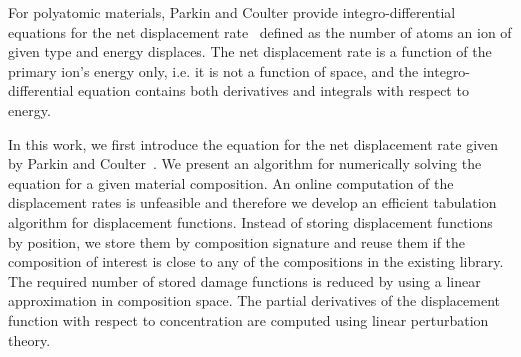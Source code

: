 \documentclass[letterpaper]{mandc2019}
\begin{document}
For polyatomic materials, Parkin and Coulter provide integro-differential equations for the net displacement rate~\cite{PC1981} defined as the number of atoms an ion of given type and energy displaces. The net displacement rate is a function of the primary ion's energy only, i.e. it is not a function of space, and the integro-differential equation contains both derivatives and integrals with respect to energy.

In this work, we first introduce the equation for the net displacement rate given by Parkin and Coulter~\cite{PC1981}. 
We present an algorithm for numerically solving the equation for a given material composition. An online computation of the displacement rates is unfeasible and therefore we develop an efficient tabulation algorithm for displacement functions. Instead of storing displacement functions by position, we store them by composition signature and reuse them if the composition of interest is close to any of the compositions in the existing library. The required number of stored damage functions is reduced by using a linear approximation in composition space. The partial derivatives of the displacement function with respect to concentration are computed using linear perturbation theory. 
\end{document}
